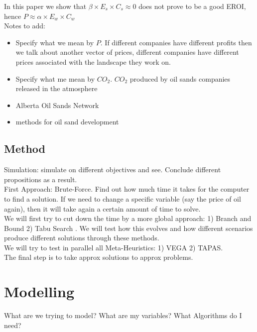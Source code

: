 \documentclass[12pt]{article}
\begin{document}
In this paper we show that $\beta \times E_s \times C_s \approx 0$ does not prove to be a good EROI, hence $P \approx \alpha \times E_w \times C_w $\\

Notes to add:
\begin{itemize}
\item Specify what we mean by $P$. If different companies have different profits then we talk about another vector of prices, different companies have different prices associated with the landscape they work on.
\item Specify what me mean by $CO_2$.  $CO_2$ produced by oil sands companies released in the atmosphere 
\item Alberta Oil Sands Network
\item methods for oil sand development
\end{itemize}

\subsection{Method}
Simulation: simulate on different objectives and see. Conclude different propositions as a result. \\

First Approach: Brute-Force. Find out how much time it takes for the computer to find a solution. If we need to change a specific variable (say the price of oil again), then it will take again a certain amount of time to solve. \\

We will first try to cut down the time by a more global approach: 1) Branch and Bound 2) Tabu Search . We will test how this evolves and how different scenarios produce different solutions through these methods.  \\

We will try to test in parallel all Meta-Heuristics: 1) VEGA 2) TAPAS. \\

The final step is to take approx solutions to approx problems. \\

\section{Modelling}

What are we trying to model? What are my variables? What Algorithms do I need?
\end{document}
